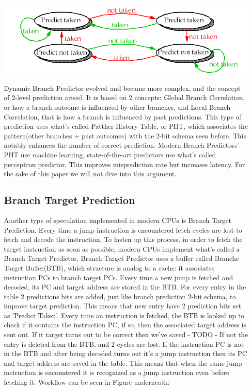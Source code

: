 \includegraphics[scale=0.35]{img/2bitBHT.png}

Dynamic Branch Predictor evolved and became more complex, and the concept of 2-level prediction arised. It is based on 2 concepts: Global Branch Correlation, or how a branch outcome is influenced by other branches, and Local Branch Correlation, that is how a branch is influenced by past predictions. This type of prediction uses what's called Patther History Table, or PHT, which associates the pattern(other branches + past outcomes) with the 2-bit schema seen before. This notably enhances the number of correct prediction.
Modern Branch Predictors' PHT use machine learning, state-of-the-art predictors use what's called perceptron predictor. This improves misprediction rate but increases latency. For the sake of this paper we will not dive into this argument.

\subsection{Branch Target Prediction}
Another type of speculation implemented in modern CPUs is Branch Target Prediction.
Every time a jump instruction is encountered fetch cycles are lost to fetch and decode the instruction.
To fasten up this process, in order to fetch the target instruction as soon as possible, modern CPUs implement what's called a Branch Target Predictor.
Branch Target Predictor uses a buffer called Branche Target Buffer(BTB), which structure is analog to a cache: it associates instruction PCs to branch target PCs. Every time a new jump is fetched and decoded, its PC and target address are stored in the BTB.
For every entry in the table 2 predictions bits are added, just like branch prediction 2-bit schema, to improve target prediction.
This means that new entry have 2 prediction bits set as 'Predict Taken'.
Every time an instruction is fetched, the BTB is looked up to check if it contains the instruction PC, if so, then the associated target address is sent out.
If it target turns out to be correct then we've saved - TODO -
If not the entry is deleted from the BTB, and 2 cycles are lost.
If the instruction PC is not in the BTB and after being decoded turns out it's a jump instruction then its PC and target address are saved in the table.
This means that when the same jump instruction is encountered it is recognized as a jump instruction even before fetching it.
Workflow can be seen in Figure underneath:

